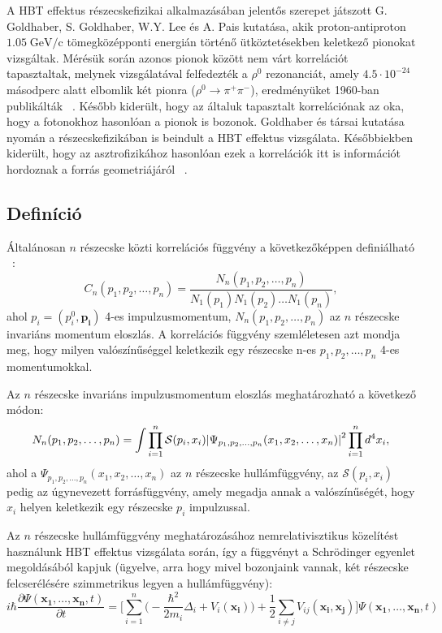 \documentclass[11pt,a4paper]{article}
\numberwithin{equation}{subsection}
\numberwithin{figure}{section}
\begin{document}
A HBT effektus részecskefizikai alkalmazásában jelentős szerepet játszott G. Goldhaber, S. Goldhaber, W.Y. Lee és A. Pais kutatása, akik proton-antiproton $1.05\;\mathrm{GeV/c}$ tömegközépponti energián történő ütköztetésekben keletkező pionokat vizsgáltak. Mérésük során azonos pionok között nem várt korrelációt tapasztaltak, melynek vizsgálatával felfedezték a $\rho^0$ rezonanciát, amely $4.5\cdot 10^{-24}$ másodperc alatt elbomlik két pionra ($\rho^0\rightarrow \pi^+\pi^-$), eredményüket 1960-ban publikálták ~\cite{Goldhaber:1960sf}. Később kiderült, hogy az általuk tapasztalt korrelációnak az oka, hogy a fotonokhoz hasonlóan a pionok is bozonok. Goldhaber és társai kutatása nyomán a részecskefizikában is beindult a HBT effektus vizsgálata. Későbbiekben kiderült, hogy az asztrofizikához hasonlóan ezek a korrelációk itt is információt hordoznak a forrás geometriájáról ~\cite{Padula:2004ba, CsanadHabil}. 


\subsection{Definíció}

Általánosan $n$ részecske közti korrelációs függvény a következőképpen definiálható ~\cite{Alt:1999cs, Csorgo:1999sj}:
\begin{equation}
C_n(p_1, p_2, \dots, p_n)=\frac{ N_n(p_1, p_2, \dots, p_n)  }{ N_1(p_1)N_1(p_2)\dots N_1(p_n)},
\label{eq:Cn}
\end{equation}
ahol $p_i=(p_i^0, \bm{p_i})$ 4-es impulzusmomentum, $ N_n(p_1, p_2, \dots, p_n)$ az $n$ részecske invariáns momentum eloszlás. A korrelációs függvény szemléletesen azt mondja meg, hogy milyen valószínűséggel keletkezik egy részecske n-es $p_1, p_2, \dots, p_n$ 4-es momentumokkal.

Az $n$ részecske invariáns impulzusmomentum eloszlás meghatározható a következő módon:
\begin{equation}
N_n(p_1, p_2, \dots, p_n) = \int \prod_{i=1}^{n}\mathcal{S}(p_i, x_i)\abs{\Psi_{p_1, {p_2}, \dots, {p_n}}({x_1}, {x_2}, \dots, {x_n})}^2\prod_{i=1}^{n}d^4 x_i,
\label{eq:Nn}
\end{equation}
ahol a $\Psi_{p_1, {p_2}, \dots, {p_n}}({x_1}, {x_2}, \dots, {x_n})$ az $n$ részecske hullámfüggvény, az $\mathcal{S}({p_i}, {x_i})$ pedig az úgynevezett forrásfüggvény, amely megadja annak a valószínűségét, hogy ${x_i}$ helyen keletkezik egy részecske ${p_i}$ impulzussal.

Az $n$ részecske hullámfüggvény meghatározásához nemrelativisztikus közelítést használunk HBT effektus vizsgálata során, így a függvényt a Schrödinger egyenlet megoldásából kapjuk (ügyelve, arra hogy mivel bozonjaink vannak, két részecske felcserélésére szimmetrikus legyen a hullámfüggvény):
\begin{equation}
i\hbar\frac{\partial \Psi(\bm{x_1},\dots, \bm{x_n},t )}{\partial t} = \Bigg[\sum_{i=1}^{n}\bigg(-\frac{\hbar^2}{2m_i}\Delta_i + V_i(\bm{x_i})\bigg) + \frac{1}{2}\sum_{i\neq j} V_{ij}(\bm{x_i},\bm{x_j})\Bigg]\Psi(\bm{x_1},\dots, \bm{x_n} ,t)
\label{eq:Sch0}
\end{equation}
\end{document}
